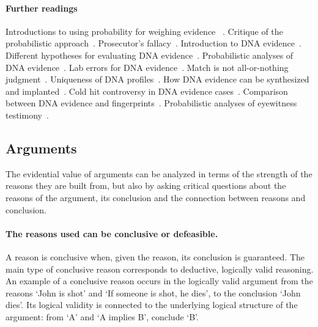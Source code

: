 \documentclass[10pt]{article}
\begin{document}
\paragraph{Further readings} Introductions to using probability for weighing evidence 
~\citep{finkelsteinFairley1970, dawid2002, morteraDawid2007}. Critique 
of the probabilistic approach~\citep{tribe1971, cohen1977, allenPardo2007}.
Prosecutor's fallacy~\citep{thompsonSchumann1987}.
Introduction to DNA evidence~\citep{wasserman2008, kayeSensabaugh2000}.
Different hypotheses for evaluating DNA evidence~\citep{koehler1993, cookEtAl1998, evettEtal2000}. 
Probabilistic analyses of DNA evidence~\citep{robertsonVignaux1995, buckleton2005, balding2005}. 
 Lab errors for DNA evidence~\citep{thompsonEtAl2003}. 
 Match is not all-or-nothing judgment~\citep{kaye1993}. 
Uniqueness of DNA profiles~\citep{kaye2013, weir2007}.
How DNA evidence can be synthesized and implanted~\citep{frumkinEtAl2009}. 
Cold hit controversy in DNA evidence cases~\citep{NRC1996, baldingDonnely1996}. 
Comparison between DNA evidence and fingerprints~\citep{zabell2005}. 
Probabilistic analyses of eyewitness testimony~\citep{friedman1987, schum1994, schumStarace2001}. 

\subsection{Arguments}
\label{sec:valueArgs}

The evidential value of arguments can be analyzed in terms of the strength 
of the reasons they are built from, but also by asking critical questions 
about the reasons of the argument, its conclusion and the connection 
between reasons and conclusion. 

\paragraph{The reasons used can be conclusive or 
defeasible.} A reason is conclusive when, given the reason, its conclusion is guaranteed. The main type of conclusive reason corresponds to 
deductive, logically valid reasoning. 
An example of a conclusive reason occurs in the logically valid argument from the reasons `John is shot' and `If someone is shot, he dies', to 
the conclusion `John dies'. 
Its logical validity is connected to the underlying logical structure of the argument: 
from `A' and `A implies B', conclude `B'. 
\end{document}

